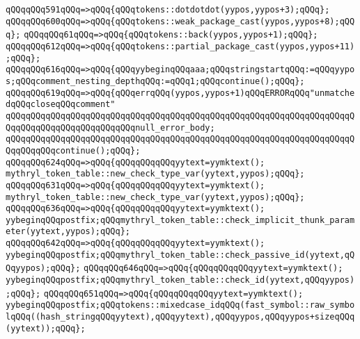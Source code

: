 \verb|qQQqqQQq591qQQq=>qQQq{qQQqtokens::dotdotdot(yypos,yypos+3);qQQq};|\newline
\verb|qQQqqQQq600qQQq=>qQQq{qQQqtokens::weak_package_cast(yypos,yypos+8);qQQq};|\newline
\verb|qQQqqQQq61qQQq=>qQQq{qQQqtokens::back(yypos,yypos+1);qQQq};|\newline
\verb|qQQqqQQq612qQQq=>qQQq{qQQqtokens::partial_package_cast(yypos,yypos+11);qQQq};|\newline
\verb|qQQqqQQq616qQQq=>qQQq{qQQqyybeginqQQqaaa;qQQqstringstartqQQq:=qQQqyypos;qQQqcomment_nesting_depthqQQq:=qQQq1;qQQqcontinue();qQQq};|\newline
\verb|qQQqqQQq619qQQq=>qQQq{qQQqerrqQQq(yypos,yypos+1)qQQqERRORqQQq"unmatchedqQQqcloseqQQqcomment"|\newline
\verb|qQQqqQQqqQQqqQQqqQQqqQQqqQQqqQQqqQQqqQQqqQQqqQQqqQQqqQQqqQQqqQQqqQQqqQQqqQQqqQQqqQQqqQQqqQQqqQQqnull_error_body;|\newline
\verb|qQQqqQQqqQQqqQQqqQQqqQQqqQQqqQQqqQQqqQQqqQQqqQQqqQQqqQQqqQQqqQQqqQQqqQQqqQQqqQQqcontinue();qQQq};|\newline
\verb|qQQqqQQq624qQQq=>qQQq{qQQqqQQqqQQqyytext=yymktext();|\newline
\verb|mythryl_token_table::new_check_type_var(yytext,yypos);qQQq};|\newline
\verb|qQQqqQQq631qQQq=>qQQq{qQQqqQQqqQQqyytext=yymktext();|\newline
\verb|mythryl_token_table::new_check_type_var(yytext,yypos);qQQq};|\newline
\verb|qQQqqQQq636qQQq=>qQQq{qQQqqQQqqQQqyytext=yymktext();|\newline
\verb|yybeginqQQqpostfix;qQQqmythryl_token_table::check_implicit_thunk_parameter(yytext,yypos);qQQq};|\newline
\verb|qQQqqQQq642qQQq=>qQQq{qQQqqQQqqQQqyytext=yymktext();|\newline
\verb|yybeginqQQqpostfix;qQQqmythryl_token_table::check_passive_id(yytext,qQQqyypos);qQQq};|\newline
\verb|qQQqqQQq646qQQq=>qQQq{qQQqqQQqqQQqyytext=yymktext();|\newline
\verb|yybeginqQQqpostfix;qQQqmythryl_token_table::check_id(yytext,qQQqyypos);qQQq};|\newline
\verb|qQQqqQQq651qQQq=>qQQq{qQQqqQQqqQQqyytext=yymktext();|\newline
\verb|yybeginqQQqpostfix;qQQqtokens::mixedcase_idqQQq(fast_symbol::raw_symbolqQQq((hash_stringqQQqyytext),qQQqyytext),qQQqyypos,qQQqyypos+sizeqQQq(yytext));qQQq};|\newline

